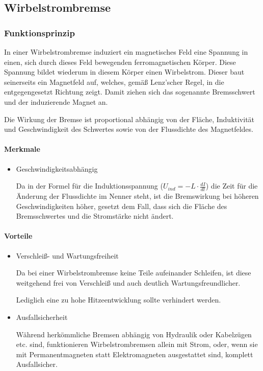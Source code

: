 \subsection{Wirbelstrombremse}

\subsubsection{Funktionsprinzip}

In einer Wirbelstrombremse induziert ein magnetisches Feld eine Spannung in einen, sich durch dieses Feld bewegenden ferromagnetischen Körper. Diese Spannung bildet wiederum in diesem Körper einen Wirbelstrom. Dieser baut seinerseits ein Magnetfeld auf, welches, gemäß Lenz'scher Regel, in die entgegengesetzt Richtung zeigt. Damit ziehen sich das sogenannte Bremsschwert und der induzierende Magnet an.

Die Wirkung der Bremse ist proportional abhängig von der Fläche, Induktivität und Geschwindigkeit des Schwertes sowie von der Flussdichte des Magnetfeldes.


\paragraph{Merkmale}

\begin{itemize}

	\item Geschwindigkeitsabhängig
	
Da in der Formel für die Induktionsspannung ($U_{ind}=-L \cdot \frac{dI}{dt}$) die Zeit für die Änderung der Flussdichte im Nenner steht, ist die Bremswirkung bei höheren Geschwindigkeiten höher, gesetzt dem Fall, dass sich die Fläche des Bremsschwertes und die Stromstärke nicht ändert.

\end{itemize}


\paragraph{Vorteile}

\begin{itemize}
	\item Verschleiß- und Wartungsfreiheit
	
Da bei einer Wirbelstrombremse keine Teile aufeinander Schleifen, ist diese weitgehend frei von Verschleiß und auch deutlich Wartungsfreundlicher.

Lediglich eine zu hohe Hitzeentwicklung sollte verhindert werden.

	\item Ausfallsicherheit
	
Während herkömmliche Bremsen abhängig von Hydraulik oder Kabelzügen etc. sind, funktionieren Wirbelstrombremsen allein mit Strom, oder, wenn sie mit Permanentmagneten statt Elektromagneten ausgestattet sind, komplett Ausfallsicher.

\end{itemize}

